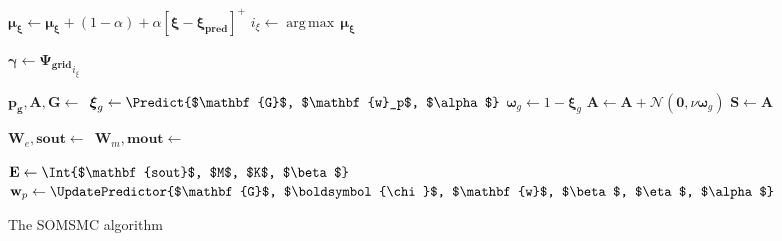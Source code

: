 \documentclass[a4paper]{article}
\DeclareMathOperator*{\argmax}{\operatorname*{arg\,max}} %
\begin{document}
\begin{algorithm}[H]
{{        \BlankLine
      
        $\boldsymbol{\mu_{\xi}}\leftarrow\boldsymbol{\mu_{\xi}} + \left(1-\alpha\right) + \alpha\left[\boldsymbol{\xi} - \boldsymbol{\xi_{pred}}\right]^{+}$\;
        $i_{\xi} \leftarrow \argmax\,\boldsymbol{\mu_{\xi}}$\;
        
        $\boldsymbol{\gamma}\leftarrow\mathbf{\Psi_{grid}}_{i_{\xi}}$
        
        \BlankLine
              
    	$\mathbf{p_g}, \mathbf{A},\mathbf{G}\leftarrow$\,\;  
        $\boldsymbol{\xi}_{g}\leftarrow\Predict{$\mathbf{G}$, $\mathbf{w}_p$, $\alpha$}$\;
        $\boldsymbol{\omega}_{g}\leftarrow 1 - \boldsymbol{\xi}_{g}$\;
        $\mathbf{A}\leftarrow\mathbf{A} + \mathcal{N}(\mathbf{0}, \nu\boldsymbol{\omega}_{g})$\; 
        $\mathbf{S}\leftarrow\mathbf{A}$\;
        
        \BlankLine
        
        $\mathbf{W}_e,\mathbf{sout}\leftarrow$\,\;
        $\mathbf{W}_m,\mathbf{mout}\leftarrow$\,\;
                
        \BlankLine
          
        $\mathbf{E}\leftarrow\Int{$\mathbf{sout}$, $M$, $K$, $\beta$}$\;
        \;
        $\mathbf{w}_p\leftarrow\UpdatePredictor{$\mathbf{G}$, $\boldsymbol{\chi}$, 
        			$\mathbf{w}$, $\beta$, $\eta$, $\alpha$}$\;
                            
        \BlankLine
          
    }
}
\caption{The SOMSMC algorithm}\label{smc2}
\end{algorithm}
\end{document}
